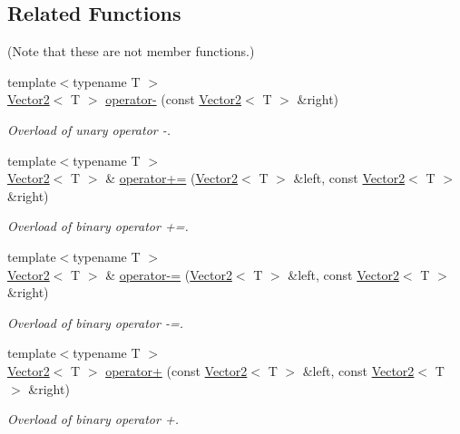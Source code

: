 \subsection*{Related Functions}
(Note that these are not member functions.) \begin{DoxyCompactItemize}
\item 
{\footnotesize template$<$typename T $>$ }\\\hyperlink{classsf_1_1_vector2}{Vector2}$<$ T $>$ \hyperlink{classsf_1_1_vector2_a3885c2e66dc427cec7eaa178d59d8e8b}{operator-\/} (const \hyperlink{classsf_1_1_vector2}{Vector2}$<$ T $>$ \&right)
\begin{DoxyCompactList}\small\item\em Overload of unary operator -\/. \end{DoxyCompactList}\item 
{\footnotesize template$<$typename T $>$ }\\\hyperlink{classsf_1_1_vector2}{Vector2}$<$ T $>$ \& \hyperlink{classsf_1_1_vector2_ad4b7a9d355d57790bfc7df0ade8bb628}{operator+=} (\hyperlink{classsf_1_1_vector2}{Vector2}$<$ T $>$ \&left, const \hyperlink{classsf_1_1_vector2}{Vector2}$<$ T $>$ \&right)
\begin{DoxyCompactList}\small\item\em Overload of binary operator +=. \end{DoxyCompactList}\item 
{\footnotesize template$<$typename T $>$ }\\\hyperlink{classsf_1_1_vector2}{Vector2}$<$ T $>$ \& \hyperlink{classsf_1_1_vector2_a30a5a12ad03c9a3a982a0a313bf84e6f}{operator-\/=} (\hyperlink{classsf_1_1_vector2}{Vector2}$<$ T $>$ \&left, const \hyperlink{classsf_1_1_vector2}{Vector2}$<$ T $>$ \&right)
\begin{DoxyCompactList}\small\item\em Overload of binary operator -\/=. \end{DoxyCompactList}\item 
{\footnotesize template$<$typename T $>$ }\\\hyperlink{classsf_1_1_vector2}{Vector2}$<$ T $>$ \hyperlink{classsf_1_1_vector2_a72421239823c38a6b780c86a710ead07}{operator+} (const \hyperlink{classsf_1_1_vector2}{Vector2}$<$ T $>$ \&left, const \hyperlink{classsf_1_1_vector2}{Vector2}$<$ T $>$ \&right)
\begin{DoxyCompactList}\small\item\em Overload of binary operator +. \end{DoxyCompactList}\item 

\end{DoxyCompactItemize}
